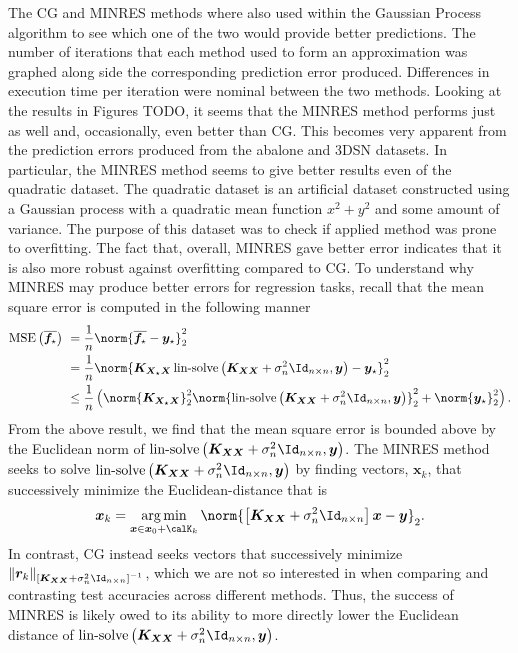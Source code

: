 The CG and MINRES methods where also used within the Gaussian Process algorithm to see which one of the two would provide better predictions. The number of iterations that each method used to form an approximation was graphed along side the corresponding prediction error produced. Differences in execution time per iteration were nominal between the two methods. Looking at the results in Figures TODO, it seems that the MINRES method performs just as well and, occasionally, even better than CG. This becomes very apparent from the prediction errors produced from the abalone and 3DSN datasets. In particular, the MINRES method seems to give better results even of the quadratic dataset. The quadratic dataset is an artificial dataset constructed using a Gaussian process with a quadratic mean function $x^2 + y^2$ and some amount of variance. The purpose of this dataset was to check if applied method was prone to overfitting. The fact that, overall, MINRES gave better error indicates that it is also more robust against overfitting compared to CG. To understand why MINRES may produce better errors for regression tasks, recall that the mean square error is computed in the following manner
\begin{align*}
    \operatorname{MSE} \left( \overline{\bm{f}_{\star}} \right) \
     & = \frac{1}{n} \norm{\overline{\bm{f}_{\star}} - \bm{y}_{\star}}_2^2                                                                                                                                \\
     & = \frac{1}{n} \norm{\bm{K_{X_{\star} X}} \operatorname{lin-solve} \left( \bm{K_{XX}} + \sigma_n^2 \Id_{n \times n} , \bm{y} \right) - \bm{y}_{\star}}_2^2                                          \\
     & \leq \frac{1}{n} \left( \norm{\bm{K_{X_{\star} X}}}_2^2 \norm{\operatorname{lin-solve} \left( \bm{K_{XX}} + \sigma_n^2 \Id_{n \times n} , \bm{y} \right)}_2^2 + \norm{\bm{y}_{\star}}_2^2 \right).
\end{align*}
From the above result, we find that the mean square error is bounded above by the Euclidean norm of $\operatorname{lin-solve} \left( \bm{K_{XX}} + \sigma_n^2 \Id_{n \times n} , \bm{y} \right)$. The MINRES method seeks to solve $\operatorname{lin-solve} \left( \bm{K_{XX}} + \sigma_n^2 \Id_{n \times n} , \bm{y} \right)$ by finding vectors, $\bm{x}_k$, that successively minimize the Euclidean-distance that is
\begin{equation*}
    \bm{x}_k = \argmin_{\bm{x} \in \bm{x}_0 + \calK_k} \norm{\left[ \bm{K_{XX}} + \sigma_n^2 \Id_{n \times n} \right] \bm {x} - \bm{y}}_2.
\end{equation*}
In contrast, CG instead seeks vectors that successively minimize $\| \bm{r}_{k} \|_{\left[ \bm{K_{XX}} + \sigma_n^2 \Id_{n \times n} \right]^{-1}}$, which we are not so interested in when comparing and contrasting test accuracies across different methods. Thus, the success of MINRES is likely owed to its ability to more directly lower the Euclidean distance of $\operatorname{lin-solve} \left( \bm{K_{XX}} + \sigma_n^2 \Id_{n \times n} , \bm{y} \right)$.